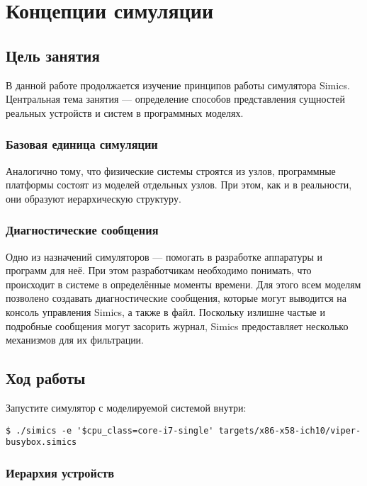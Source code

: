 \chapter{Концепции симуляции}\label{chap:lab02}

\section{Цель занятия}

В данной работе продолжается изучение принципов работы симулятора Simics. Центральная тема занятия --- определение способов представления сущностей реальных устройств и систем в программных моделях.

\subsection{Базовая единица симуляции} 

Аналогично тому, что физические системы строятся из узлов, программные платформы состоят из моделей отдельных узлов. При этом, как и в реальности, они образуют иерархическую структуру.

\subsection{Диагностические сообщения}

Одно из назначений симуляторов --- помогать в разработке аппаратуры и программ для неё. При этом разработчикам необходимо понимать, что происходит в системе в определённые моменты времени. Для этого всем моделям позволено создавать диагностические сообщения, которые могут выводится на консоль управления Simics, а также в файл. Поскольку излишне частые и подробные сообщения могут засорить журнал, Simics предоставляет несколько механизмов для их фильтрации.

\section{Ход работы}

Запустите симулятор с моделируемой системой внутри:

\begin{lstlisting}
$ ./simics -e '$cpu_class=core-i7-single' targets/x86-x58-ich10/viper-busybox.simics
\end{lstlisting}

\subsection{Иерархия устройств}

